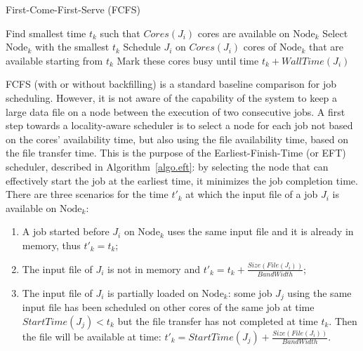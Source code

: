 \documentclass[conference,10pt]{IEEEtran}
\newcommand{\Node}[1]{\ensuremath{\mathrm{Node}_{#1}}\xspace}
\newcommand{\file}{\ensuremath{\mathit{File}}\xspace}
\newcommand{\size}{\ensuremath{\mathit{Size}}\xspace}
\newcommand{\bandwidth}{\mathit{BandWidth}\xspace}
\newcommand{\core}{\mathit{Cores}\xspace}
\newcommand{\walltime}{\mathit{WallTime}\xspace}
\newcommand{\start}{\mathit{StartTime}\xspace}
\newcommand{\nodeset}{\ensuremath{\mathbb{N}}\xspace}
\begin{document}
\begin{algorithm}[htbp]%
\caption{First-Come-First-Serve (FCFS)}\label{algo.fcfs}
\begin{algorithmic}[1]
        \ForEach{$\Node{k} \in \nodeset$}
        \State Find smallest time $t_k$ such that $\core(J_i)$ cores are available on \Node{k}\label{fcfs.ln.find}
        \EndFor
        \State Select \Node{k}  with the smallest $t_k$
        \State Schedule $J_i$ on $\core(J_i)$ cores of \Node{k} that are available starting from $t_k$
        \State Mark these cores busy until time $t_k +\walltime(J_i)$
	\EndFor
	\end{algorithmic}
\end{algorithm}


FCFS (with or without backfilling) is a standard baseline comparison
for job scheduling. However, it is not aware of the capability of the
system to keep a large data file on a node between the execution of
two consecutive jobs. A first step towards a locality-aware scheduler
is to select a node for each job not based on the cores' availability
time, but also using the file availability time, based on the file
transfer time. This is the purpose of the Earliest-Finish-Time (or
EFT) scheduler, described in Algorithm~\ref{algo.eft}: by selecting
the node that can effectively start the job at the earliest time, it
minimizes the job completion time. There are three scenarios for the
time $t'_k$ at which the input file of a job $J_i$ is available on
\Node{k}:
\begin{enumerate}
\item A job started before $J_i$ on \Node{k} uses the same input
  file and it is already in memory, thus $t'_k=t_k$;
\item The input file of $J_i$ is not in memory and
  $t'_k=t_k+\frac{\size(\file(J_i))}{\bandwidth}$;
\item The input file of $J_i$ is partially loaded on \Node{k}: some
  job $J_j$ using the same input file has been scheduled on other cores of
  the same job at time $\start(J_j)<t_k$ but the file transfer has not
  completed at time $t_k$. Then the file will be available at time:
  $t'_k = \start(J_j)+\frac{\size(\file(J_i))}{\bandwidth}.$
\end{enumerate}
\end{document}
